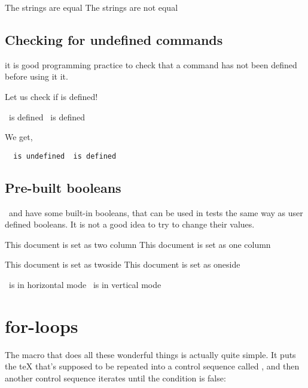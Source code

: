 \begin{teX}
\begin{teX}
\begin{teX}
\def\stringone{myname}
\def\stringtwo{myname}
\ifthenelse{\equal{\uppercase{\stringone}}{\uppercase{\stringtwo}}}
{The strings are equal}
{The strings are not equal}


\subsection{Checking for undefined commands}
it is good programming practice to check that a command has not been defined before using it it.

Let us check if  is defined!

\begin{teX}
\ifthenelse{\isundefined{\isundefined}} 
  {\string\isundefined\ is defined}
  {\string\isundefined\ is defined}
\end{teX}
\medskip

We get,

{\tt
\ifthenelse{\isundefined{\isundefined}} 
  {\string\isundefined\ is undefined}
  {\string\isundefined\ is defined}
}
\medskip



\subsection{Pre-built booleans}
\tex\ and \latex have some built-in booleans, that can be used in
tests the same way as user defined booleans. It is not a good idea
to try to change their values.

\begin{teX}
\ifthenelse{\@twocolumn}
   {This document is set as two column}
   {This document is set as one column}

\ifthenelse{\@twoside}
   {This document is set as twoside}
   {This document is set as oneside}

\ifthenelse{\hmode}
   {\tex\  is in horizontal mode}
   {\tex\  is in vertical mode}
\end{teX}



\section{for-loops}

The  macro that does all these wonderful things is actually quite simple.
It puts the  teX    that's supposed to be repeated into a control sequence called
, and then another control sequence iterates until the condition is false:


\end{teX}
\end{teX}
\end{teX}
